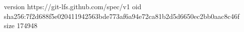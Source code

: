 version https://git-lfs.github.com/spec/v1
oid sha256:7f2d688f5e020411942563bde773af6a94e72ca81b2d5d6650ec2bb0aac8c46f
size 174948
